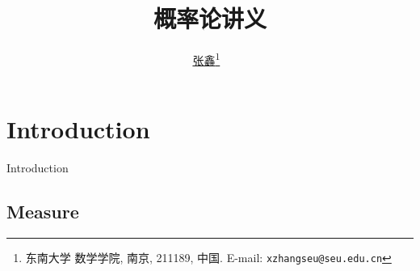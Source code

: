 \documentclass[
  11pt,
  letterpaper,
  onesidefontset=none,
]{ctexbook}
\title{\Large 概率论讲义}
\author{\href{https://math.seu.edu.cn/zx\_en/list.htm}{张鑫}\footnote{东南大学 数学学院, 南京, 211189, 中国. E-mail: \texttt{xzhangseu@seu.edu.cn}}\,~\orcidlink{0000-0001-6670-5351}}
\renewcommand*\contentsname{Table of contents}
\newcommand\contentsname{Table of contents}
\renewcommand*\listfigurename{List of Figures}
\newcommand\listfigurename{List of Figures}
\renewcommand*\listtablename{List of Tables}
\newcommand\listtablename{List of Tables}
\renewcommand*\figurename{Figure}
\newcommand\figurename{Figure}
\renewcommand*\tablename{Table}
\newcommand\tablename{Table}
\theoremstyle{plain}
\theoremstyle{remark}
\begin{document}
\maketitle
\clearpage
\mbox{}\thispagestyle{empty}
\clearpage

\frontmatter
{}
\markright{}

\renewcommand*\contentsname{目录}
\renewcommand*\listfigurename{图索引}
\renewcommand*\listtablename{表索引}
\renewcommand*\figurename{图}
\renewcommand*\tablename{表}

\pagestyle{fancy}

\makeatletter
\let\theorem\relax\let\c@theorem\relax
\let\lemma\relax\let\c@lemma\relax
\let\corollary\relax\let\c@corollary\relax
\let\definition\relax\let\c@definition\relax
\let\proposition\relax\let\c@proposition\relax
\let\example\relax\let\c@example\relax
\let\remark\relax\let\c@remark\relax
\makeatother
\newtheorem{theorem}{定理}[section]
\newtheorem{lemma}{引理}[section]
\newtheorem{corollary}{推论}[section]
\newtheorem{definition}{定义}[section]
\newtheorem{proposition}{命题}[section]
\newtheorem{example}{例}[section]
\newtheorem{remark}{注}[section]
\renewcommand{\proofname}{证明}

{
\setcounter{tocdepth}{1}
\tableofcontents
}

\mainmatter
\pagestyle{fancy}


\chapter*{Introduction}\label{introduction}


Introduction

\section*{Measure}\label{measure}

\end{document}
